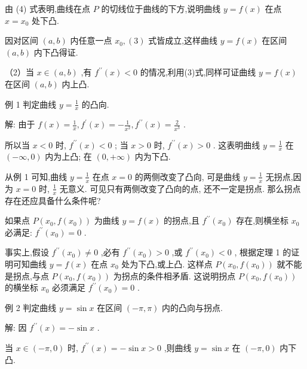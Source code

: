 \documentclass[10pt]{article}
\begin{document}
由 (4) 式表明,曲线在点 \(P\) 的切线位于曲线的下方,说明曲线 \(y = f\left( x\right)\) 在点 \(x = {x}_{0}\) 处下凸.

因对区间 \(\left( {a,b}\right)\) 内任意一点 \({x}_{0},\left( 3\right)\) 式皆成立,这样曲线 \(y = f\left( x\right)\) 在区间 \(\left( {a,b}\right)\) 内下凸得证.

（2）当 \(x \in \left( {a,b}\right)\) ,有 \({f}^{\prime \prime }\left( x\right) < 0\) 的情况,利用(3)式,同样可证曲线 \(y = f\left( x\right)\) 在区间 \(\left( {a,b}\right)\) 内上凸.

例 1 判定曲线 \(y = \frac{1}{x}\) 的凸向.

解: 由于 \(f\left( x\right) = \frac{1}{x},{f}^{\prime }\left( x\right) = - \frac{1}{{x}^{2}},{f}^{\prime \prime }\left( x\right) = \frac{2}{{x}^{3}}\) .

所以当 \(x < 0\) 时, \({f}^{\prime \prime }\left( x\right) < 0\) ; 当 \(x > 0\) 时, \({f}^{\prime \prime }\left( x\right) > 0\) . 这表明曲线 \(y = \frac{1}{x}\) 在 \(\left( {-\infty ,0}\right)\) 内为上凸; 在 \(\left( {0, + \infty }\right)\) 内为下凸.

从例 1 可知,曲线 \(y = \frac{1}{x}\) 在点 \(x = 0\) 的两侧改变了凸向, 可是曲线 \(y = \frac{1}{x}\) 无拐点,因为 \(x = 0\) 时, \(\frac{1}{x}\) 无意义. 可见只有两侧改变了凸向的点, 还不一定是拐点. 那么拐点存在还应具备什么条件呢?

如果点 \(P\left( {{x}_{0},f\left( {x}_{0}\right) }\right)\) 为曲线 \(y = f\left( x\right)\) 的拐点,且 \({f}^{\prime \prime }\left( {x}_{0}\right)\) 存在,则横坐标 \({x}_{0}\) 必满足: \({f}^{\prime \prime }\left( {x}_{0}\right) = 0\) .

事实上,假设 \({f}^{\prime \prime }\left( {x}_{0}\right) \neq 0\) ,必有 \({f}^{\prime \prime }\left( {x}_{0}\right) > 0\) ,或 \({f}^{\prime \prime }\left( {x}_{0}\right) < 0\) , 根据定理 1 的证明可知曲线 \(y = f\left( x\right)\) 在点 \({x}_{0}\) 处为下凸,或上凸. 这样点 \(P\left( {{x}_{0},f\left( {x}_{0}\right) }\right)\) 就不能是拐点,与点 \(P\left( {{x}_{0},f\left( {x}_{0}\right) }\right)\) 为拐点的条件相矛盾. 这说明拐点 \(P\left( {{x}_{0},f\left( {x}_{0}\right) }\right)\) 的横坐标 \({x}_{0}\) 必须满足 \({f}^{\prime \prime }\left( {x}_{0}\right) = 0\) .

例 2 判定曲线 \(y = \sin x\) 在区间 \(\left( {-\pi ,\pi }\right)\) 内的凸向与拐点.

解: 因 \({f}^{\prime \prime }\left( x\right) = - \sin x\) .

当 \(x \in \left( {-\pi ,0}\right)\) 时, \({f}^{\prime \prime }\left( x\right) = - \sin x > 0\) ,则曲线 \(y = \sin x\) 在 \(\left( {-\pi ,0}\right)\) 内下凸.
\end{document}
